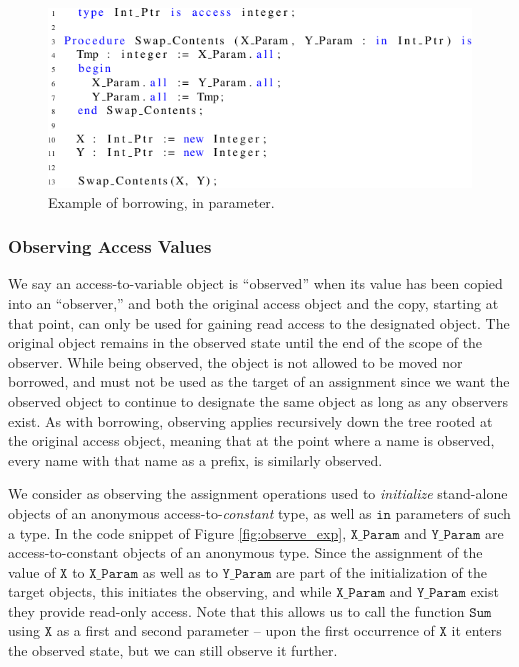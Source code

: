 \documentclass{llncs}
\newcommand\var[1]{\ensuremath{\mathtt{#1}}}
\newcommand{\keyword}[1]{\textsf{#1}}
\begin{document}
\begin{figure}[htb!]
\centering
   \includegraphics[]{borrow_ex1}
   \caption{Example of borrowing, \keyword{in} parameter.}
   \label{fig:borrow_ex1}
\end{figure}


\subsubsection{Observing Access Values}
\label{sec:observing}

We say an access-to-variable object is ``observed'' when its value has been copied into an ``observer,'' and both the original
access object and the copy, starting at that point, can only be used for gaining read access to the designated object.
The original object remains in the observed state until the end of the scope of the observer. While being observed, the object is not allowed to be moved nor
borrowed, and must not be used as the target of an assignment since we want the observed object to continue
to designate the same object as long as any observers exist.  As with borrowing, observing applies recursively down the tree rooted at the original access object, meaning that at the point where a name is observed,
every name with that name as a prefix, is similarly observed.

\smallskip
We consider as observing the assignment operations used to \textit{initialize} stand-alone objects of an anonymous access-to-\textit{constant} type, as well as \var{in} parameters of such a type.
In the code snippet of Figure \ref{fig:observe_exp}, \var{X\_Param} and \var{Y\_Param} are access-to-constant objects of an anonymous type. Since the assignment of the value of \var{X} to \var{X\_Param}
as well as to \var{Y\_Param} are part of the initialization of the target objects, this initiates the observing, and while \var{X\_Param} and \var{Y\_Param} exist they provide read-only access. Note that
this allows us to call the function \var{Sum} using \var{X} as a first and second parameter -- upon the first occurrence of \var{X} it enters the observed state, but we can still observe it further. 
\end{document}

